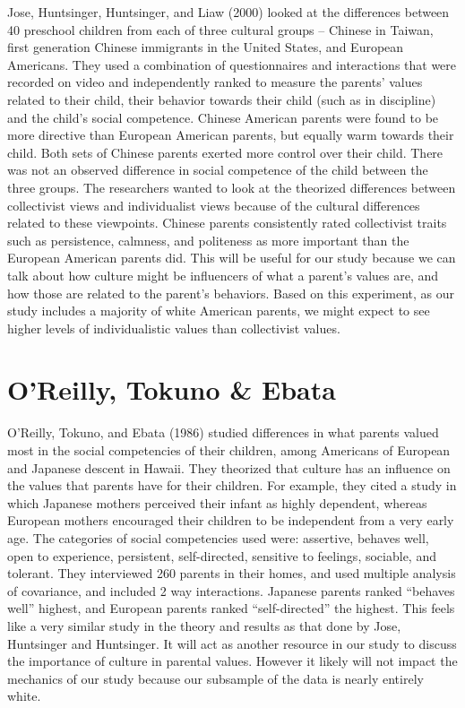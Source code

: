 \documentclass[man]{apa6}
\begin{document}
Jose, Huntsinger, Huntsinger, and Liaw (2000) looked at the differences between 40 preschool children from each of three cultural groups -- Chinese in Taiwan, first generation Chinese immigrants in the United States, and European Americans. They used a combination of questionnaires and interactions that were recorded on video and independently ranked to measure the parents' values related to their child, their behavior towards their child (such as in discipline) and the child's social competence. Chinese American parents were found to be more directive than European American parents, but equally warm towards their child. Both sets of Chinese parents exerted more control over their child. There was not an observed difference in social competence of the child between the three groups. The researchers wanted to look at the theorized differences between collectivist views and individualist views because of the cultural differences related to these viewpoints. Chinese parents consistently rated collectivist traits such as persistence, calmness, and politeness as more important than the European American parents did. This will be useful for our study because we can talk about how culture might be influencers of what a parent's values are, and how those are related to the parent's behaviors. Based on this experiment, as our study includes a majority of white American parents, we might expect to see higher levels of individualistic values than collectivist values.

\hypertarget{oreilly-tokuno-ebata}{%
\section{O'Reilly, Tokuno \& Ebata}\label{oreilly-tokuno-ebata}}

O'Reilly, Tokuno, and Ebata (1986) studied differences in what parents valued most in the social competencies of their children, among Americans of European and Japanese descent in Hawaii. They theorized that culture has an influence on the values that parents have for their children. For example, they cited a study in which Japanese mothers perceived their infant as highly dependent, whereas European mothers encouraged their children to be independent from a very early age. The categories of social competencies used were: assertive, behaves well, open to experience, persistent, self-directed, sensitive to feelings, sociable, and tolerant. They interviewed 260 parents in their homes, and used multiple analysis of covariance, and included 2 way interactions. Japanese parents ranked \enquote{behaves well} highest, and European parents ranked \enquote{self-directed} the highest. This feels like a very similar study in the theory and results as that done by Jose, Huntsinger and Huntsinger. It will act as another resource in our study to discuss the importance of culture in parental values. However it likely will not impact the mechanics of our study because our subsample of the data is nearly entirely white.
\end{document}
